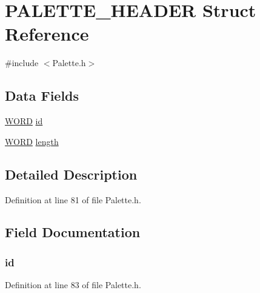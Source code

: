 \hypertarget{struct_p_a_l_e_t_t_e___h_e_a_d_e_r}{}\section{P\+A\+L\+E\+T\+T\+E\+\_\+\+H\+E\+A\+D\+E\+R Struct Reference}
\label{struct_p_a_l_e_t_t_e___h_e_a_d_e_r}


{\ttfamily \#include $<$Palette.\+h$>$}

\subsection*{Data Fields}
\begin{DoxyCompactItemize}
\item 
\hyperlink{_generic_type_defs_8h_a2b0e863dadf920709ec53d9088ee7c91}{W\+O\+R\+D} \hyperlink{struct_p_a_l_e_t_t_e___h_e_a_d_e_r_a7b7a6396b2c82ad46c6d8b2bf141a8dd}{id}
\item 
\hyperlink{_generic_type_defs_8h_a2b0e863dadf920709ec53d9088ee7c91}{W\+O\+R\+D} \hyperlink{struct_p_a_l_e_t_t_e___h_e_a_d_e_r_ac03f72dfd2e32790101f1221796ea289}{length}
\end{DoxyCompactItemize}


\subsection{Detailed Description}


Definition at line 81 of file Palette.\+h.



\subsection{Field Documentation}
\hypertarget{struct_p_a_l_e_t_t_e___h_e_a_d_e_r_a7b7a6396b2c82ad46c6d8b2bf141a8dd}{}
\subsubsection[{id}]{ id}\label{struct_p_a_l_e_t_t_e___h_e_a_d_e_r_a7b7a6396b2c82ad46c6d8b2bf141a8dd}


Definition at line 83 of file Palette.\+h.

